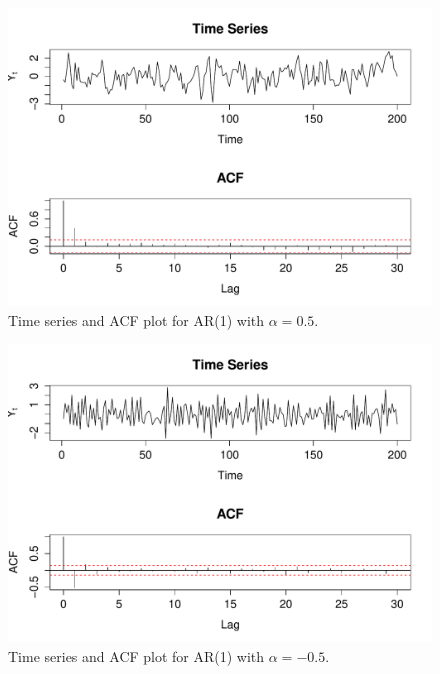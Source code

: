 \documentclass[10pt,a4paper]{article}
\begin{document}
\begin{figure}[h!]
\includegraphics[width=\linewidth]{plots/p5_alpha05.pdf}
\caption{Time series and ACF plot for AR(1) with $\alpha = 0.5$.}
\end{figure}


\begin{figure}[h!]
\includegraphics[width=\linewidth]{plots/p5_alphaneg05.pdf}
\caption{Time series and ACF plot for AR(1) with $\alpha = -0.5$.}
\end{figure}
\end{document}
